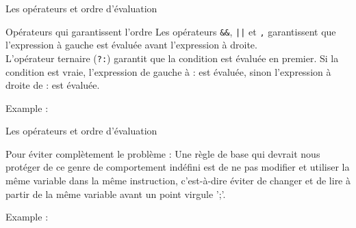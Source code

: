     \begin{frame}{Les opérateurs et ordre d'évaluation}
	  	\begin{alertblock}{Opérateurs qui garantissent l'ordre}
	  		Les opérateurs \texttt{\alert{\&\&}}, \texttt{\alert{||}} et \texttt{\alert{,}} garantissent que l'expression à gauche est évaluée avant l'expression à droite.\\
	  		L'opérateur ternaire (\texttt{\alert{?:}}) garantit que la condition est évaluée en premier. Si la condition est vraie, l'expression de gauche à \alert{:} est évaluée, sinon l'expression à droite de \alert{:} est évaluée.
	  	\end{alertblock}
  		\begin{exampleblock}{Example :}
  			\opNoUB
  		\end{exampleblock}
  	\end{frame}

	\begin{frame}{Les opérateurs et ordre d'évaluation}
		\begin{alertblock}{Pour éviter complètement le problème :}
			Une règle de base qui devrait nous protéger de ce genre de comportement indéfini est de ne pas modifier et utiliser la même variable dans la même instruction, c'est-à-dire éviter de changer et de lire à partir de la même variable avant un \alert{point virgule ';'}.
		\end{alertblock}
		\begin{exampleblock}{Example :}
			\opNoUB
		\end{exampleblock}
	\end{frame}